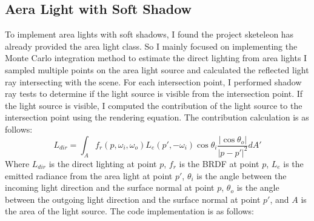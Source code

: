 \documentclass[acmtog]{acmart}
\begin{document}
\subsection{Aera Light with Soft Shadow}
To implement area lights with soft shadows, I found the project sketeleon has already provided the area light class.
So I mainly focused on implementing the Monte Carlo integration method to estimate the direct lighting from area lights
I sampled multiple points on the area light source and calculated the reflected light ray intersecting with the scene.
For each intersection point, I performed shadow ray tests to determine if the light source is visible from the intersection point.
If the light source is visible, I computed the contribution of the light source to the intersection point using the rendering equation.
The contribution calculation is as follows:
$$L_{dir} = \int_{A} f_r(p, \omega_i, \omega_o) L_e(p', -\omega_i) \cos\theta_i \frac{|\cos\theta_o|}{|p - p'|^2} dA'$$
Where $L_{dir}$ is the direct lighting at point $p$, $f_r$ is the BRDF at point $p$, $L_e$ is the emitted radiance from the area light at point $p'$, $\theta_i$ is the angle between the incoming light direction and the surface normal at point $p$, $\theta_o$ is the angle between the outgoing light direction and the surface normal at point $p'$, and $A$ is the area of the light source.
The code implementation is as follows:
\end{document}
